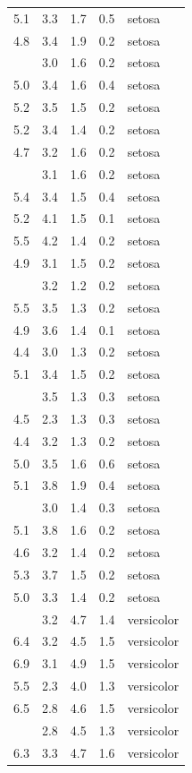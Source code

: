 \documentclass[12pt,]{krantz}
\theoremstyle{definition}
\theoremstyle{definition}
\theoremstyle{remark}
\begin{document}
\begin{longtable}[t]{rrrrl}
5.1 & 3.3 & 1.7 & 0.5 & setosa\\
4.8 & 3.4 & 1.9 & 0.2 & setosa\\
\addlinespace
5.0 & 3.0 & 1.6 & 0.2 & setosa\\
5.0 & 3.4 & 1.6 & 0.4 & setosa\\
5.2 & 3.5 & 1.5 & 0.2 & setosa\\
5.2 & 3.4 & 1.4 & 0.2 & setosa\\
4.7 & 3.2 & 1.6 & 0.2 & setosa\\
\addlinespace
4.8 & 3.1 & 1.6 & 0.2 & setosa\\
5.4 & 3.4 & 1.5 & 0.4 & setosa\\
5.2 & 4.1 & 1.5 & 0.1 & setosa\\
5.5 & 4.2 & 1.4 & 0.2 & setosa\\
4.9 & 3.1 & 1.5 & 0.2 & setosa\\
\addlinespace
5.0 & 3.2 & 1.2 & 0.2 & setosa\\
5.5 & 3.5 & 1.3 & 0.2 & setosa\\
4.9 & 3.6 & 1.4 & 0.1 & setosa\\
4.4 & 3.0 & 1.3 & 0.2 & setosa\\
5.1 & 3.4 & 1.5 & 0.2 & setosa\\
\addlinespace
5.0 & 3.5 & 1.3 & 0.3 & setosa\\
4.5 & 2.3 & 1.3 & 0.3 & setosa\\
4.4 & 3.2 & 1.3 & 0.2 & setosa\\
5.0 & 3.5 & 1.6 & 0.6 & setosa\\
5.1 & 3.8 & 1.9 & 0.4 & setosa\\
\addlinespace
4.8 & 3.0 & 1.4 & 0.3 & setosa\\
5.1 & 3.8 & 1.6 & 0.2 & setosa\\
4.6 & 3.2 & 1.4 & 0.2 & setosa\\
5.3 & 3.7 & 1.5 & 0.2 & setosa\\
5.0 & 3.3 & 1.4 & 0.2 & setosa\\
\addlinespace
7.0 & 3.2 & 4.7 & 1.4 & versicolor\\
6.4 & 3.2 & 4.5 & 1.5 & versicolor\\
6.9 & 3.1 & 4.9 & 1.5 & versicolor\\
5.5 & 2.3 & 4.0 & 1.3 & versicolor\\
6.5 & 2.8 & 4.6 & 1.5 & versicolor\\
\addlinespace
5.7 & 2.8 & 4.5 & 1.3 & versicolor\\
6.3 & 3.3 & 4.7 & 1.6 & versicolor\\

\end{longtable}
\end{document}
